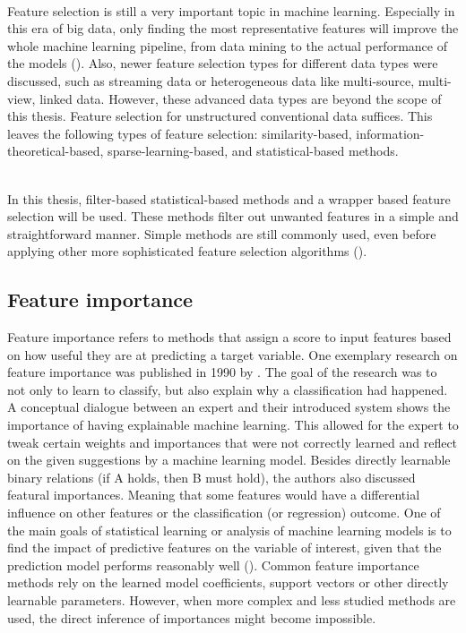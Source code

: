 ~\\Feature selection is still a very important topic in machine learning. Especially in this era of big data, only finding the most representative features will improve the whole machine learning pipeline, from data mining to the actual performance of the models (\cite{Li2017-vo}). 
Also, newer feature selection types for different data types were discussed, such as streaming data or heterogeneous data like multi-source, multi-view, linked data. However, these advanced data types are beyond the scope of this thesis. Feature selection for unstructured conventional data suffices. This leaves the following types of feature selection: similarity-based, information-theoretical-based, sparse-learning-based, and statistical-based methods.

~\\In this thesis, filter-based statistical-based methods and a wrapper based feature selection will be used. These methods filter out unwanted features in a simple and straightforward manner. Simple methods are still commonly used, even before applying other more sophisticated feature selection algorithms (\cite{Li2017-vo}).

\subsection{Feature importance}
Feature importance refers to methods that assign a score to input features based on how useful they are at predicting a target variable.
One exemplary research on feature importance was published in 1990 by \cite{Porter1990-is}. The goal of the research was to not only to learn to classify, but also explain why a classification had happened. A conceptual dialogue between an expert and their introduced system shows the importance of having explainable machine learning. This allowed for the expert to tweak certain weights and importances that were not correctly learned and reflect on the given suggestions by a machine learning model. Besides directly learnable binary relations (if A holds, then B must hold), the authors also discussed featural importances. Meaning that some features would have a differential influence on other features or the classification (or regression) outcome. 
One of the main goals of statistical learning or analysis of machine learning models is to find the impact of predictive features on the variable of interest, given that the prediction model performs reasonably well (\cite{Altmann2010-lq}). Common feature importance methods rely on the learned model coefficients, support vectors or other directly learnable parameters. However, when more complex and less studied methods are used, the direct inference of importances might become impossible. 

